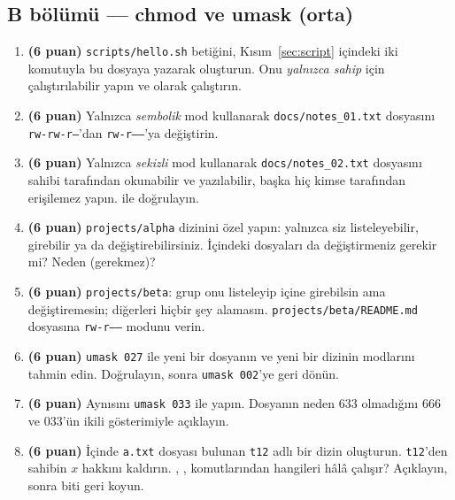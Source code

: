 \subsection*{B bölümü --- chmod ve umask (orta)}
\begin{enumerate}[leftmargin=1.8em,label=\textbf{\arabic*.},resume]
  \item \textbf{(6 puan)} \texttt{scripts/hello.sh} betiğini, Kısım~\ref{sec:script} içindeki iki  komutuyla bu dosyaya yazarak oluşturun. Onu \emph{yalnızca sahip} için çalıştırılabilir yapın ve  olarak çalıştırın.
  \item \textbf{(6 puan)} Yalnızca \emph{sembolik} mod kullanarak \texttt{docs/notes\_01.txt} dosyasını \texttt{rw-rw-r--}'dan \texttt{rw-r-----}'ya değiştirin.
  \item \textbf{(6 puan)} Yalnızca \emph{sekizli} mod kullanarak \texttt{docs/notes\_02.txt} dosyasını sahibi tarafından okunabilir ve yazılabilir, başka hiç kimse tarafından erişilemez yapın.  ile doğrulayın.
  \item \textbf{(6 puan)} \texttt{projects/alpha} dizinini özel yapın: yalnızca siz listeleyebilir, girebilir ya da değiştirebilirsiniz. İçindeki dosyaları da değiştirmeniz gerekir mi? Neden (gerekmez)?
  \item \textbf{(6 puan)} \texttt{projects/beta}: grup onu listeleyip içine girebilsin ama değiştiremesin; diğerleri hiçbir şey alamasın. \texttt{projects/beta/README.md} dosyasına \texttt{rw-r-----} modunu verin.
  \item \textbf{(6 puan)} \texttt{umask 027} ile yeni bir dosyanın ve yeni bir dizinin modlarını tahmin edin. Doğrulayın, sonra \texttt{umask 002}'ye geri dönün.
  \item \textbf{(6 puan)} Aynısını \texttt{umask 033} ile yapın. Dosyanın neden $633$ olmadığını $666$ ve $033$'ün ikili gösterimiyle açıklayın.
  \item \textbf{(6 puan)} İçinde \texttt{a.txt} dosyası bulunan \texttt{t12} adlı bir dizin oluşturun. \texttt{t12}'den sahibin $x$ hakkını kaldırın. , ,  komutlarından hangileri hâlâ çalışır? Açıklayın, sonra biti geri koyun.
\end{enumerate}

